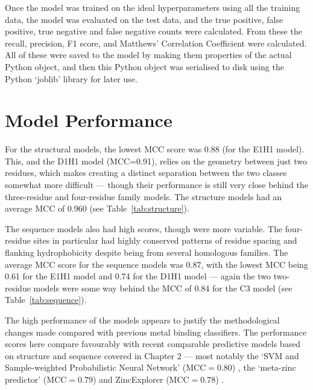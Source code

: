 Once the model was trained on the ideal hyperparameters using all the training data, the model was evaluated on the test data, and the true positive, false positive, true negative and false negative counts were calculated. From these the recall, precision, F1 score, and Matthews' Correlation Coefficient were calculated. All of these were saved to the model by making them properties of the actual Python object, and then this Python object was serialised to disk using the Python `joblib' library for later use.

\section{Model Performance}

For the structural models, the lowest MCC score was 0.88 (for the E1H1 model). This, and the D1H1 model (MCC=0.91), relies on the geometry between just two residues, which makes creating a distinct separation between the two classes somewhat more difficult --- though their performance is still very close behind the three-residue and four-residue family models. The structure models had an average MCC of 0.960 (see Table~\ref{tab:structure}).

The sequence models also had high scores, though were more variable. The four-residue sites in particular had highly conserved patterns of residue spacing and flanking hydrophobicity despite being from several homologous families. The average MCC score for the sequence models was 0.87, with the lowest MCC being 0.61 for the E1H1 model and 0.74 for the D1H1 model --- again the two two-residue models were some way behind the MCC of 0.84 for the C3 model (see Table~\ref{tab:sequence}).

The high performance of the models appears to justify the methodological changes made compared with previous metal binding classifiers. The performance scores here compare favourably with recent comparable predictive models based on structure and sequence covered in Chapter 2 --- most notably the `SVM and Sample-weighted Probabilistic Neural Network' (MCC$=0.80$) \cite{li2019}, the `meta-zinc predictor' (MCC$=0.79$) \cite{li2017} and ZincExplorer (MCC$=0.78$) \cite{chen2013}.

